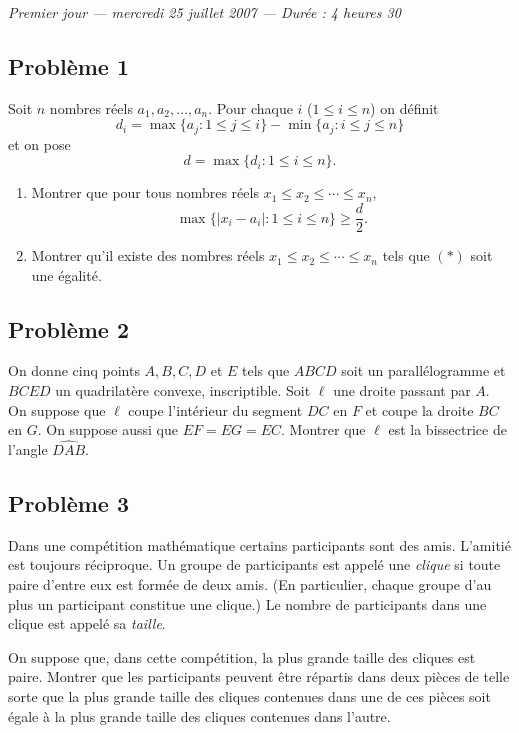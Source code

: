 
\begin{center}
  \emph{Premier jour --- mercredi 25 juillet 2007 --- Durée : 4 heures 30}
\end{center}

\subsection*{Problème 1}
Soit $n$ nombres réels $a_1, a_2, \ldots, a_n$. Pour chaque $i$ ($1 \leq i \leq n$) on définit
\[
d_i = \max\{a_j : 1 \leq j \leq i\} - \min\{a_j : i \leq j \leq n\}
\]
et on pose
\[
d = \max\{d_i : 1 \leq i \leq n\}.
\]
\begin{enumerate}
  \item[(a)] Montrer que pour tous nombres réels $x_1 \leq x_2 \leq \cdots \leq x_n$,
  \[
  \max\{|x_i - a_i| : 1 \leq i \leq n\} \geq \frac{d}{2}. \tag{$*$}
  \]
  \item[(b)] Montrer qu'il existe des nombres réels $x_1 \leq x_2 \leq \cdots \leq x_n$ tels que $(*)$ soit
  une égalité.
\end{enumerate}

\subsection*{Problème 2}
On donne cinq points $A, B, C, D$ et $E$ tels que $ABCD$ soit un parallélogramme et $BCED$ un quadrilatère
convexe, inscriptible. Soit $\ell$ une droite passant par $A$. On suppose que $\ell$ coupe l'intérieur du
segment $DC$ en $F$ et coupe la droite $BC$ en $G$. On suppose aussi que $EF = EG = EC$. Montrer que $\ell$ est
la bissectrice de l'angle $\widehat{DAB}$.

\subsection*{Problème 3}
Dans une compétition mathématique certains participants sont des amis. L'amitié est toujours réciproque. Un
groupe de participants est appelé une \emph{clique} si toute paire d'entre eux est formée de deux amis. (En
particulier, chaque groupe d'au plus un participant constitue une clique.) Le nombre de participants dans une
clique est appelé sa \emph{taille}.

On suppose que, dans cette compétition, la plus grande taille des cliques est paire. Montrer que les
participants peuvent être répartis dans deux pièces de telle sorte que la plus grande taille des cliques
contenues dans une de ces pièces soit égale à la plus grande taille des cliques contenues dans l'autre.

